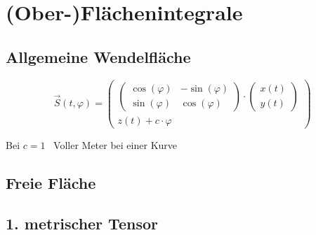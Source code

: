 \section{(Ober-)Flächenintegrale}


\subsection{Allgemeine Wendelfläche}
\[
    \vec{S}(t, \varphi) = \begin{pmatrix}
        \begin{pmatrix}
            \cos(\varphi) & -\sin(\varphi)\\
            \sin(\varphi) & \cos(\varphi)
        \end{pmatrix}
        \cdot \begin{pmatrix}
            x(t)\\
            y(t)
        \end{pmatrix}\\
        z(t) + c \cdot \varphi
    \end{pmatrix}
\]

Bei $c = 1$ \textrightarrow\ Voller Meter bei einer Kurve %


\subsection{Freie Fläche}



\subsection{1. metrischer Tensor}


